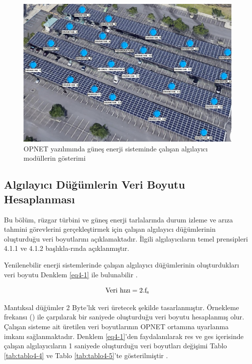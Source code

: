 \begin{figure}[htbp]
\centerline{\includegraphics[width= 14cm]{Resim/mak2solar.png}}
\caption{OPNET yazılımında güneş enerji sisteminde çalışan algılayıcı modüllerin gösterimi}
\label{fig:4-3}
\end{figure}


\subsection{Algılayıcı Düğümlerin Veri Boyutu Hesaplanması}\label{verboyut}

Bu bölüm, rüzgar türbini ve güneş enerji tarlalarında durum izleme ve arıza tahmini görevlerini gerçekleştirmek için çalışan algılayıcı düğümlerinin oluşturduğu veri boyutlarını açıklamaktadır. İlgili algılayıcıların temel prensipleri 4.1.1 ve 4.1.2 başlıkla-rında açıklanmıştır.


Yenilenebilir enerji sistemlerinde çalışan algılayıcı düğümlerinin oluşturdukları veri boyutu Denklem \eqref{eq4-1} ile bulunabilir \cite{ahmed2011simulation}.


\begin{equation}
\text{Veri hızı} = 2.\text{f\textsubscript{s}} \label{eq4-1}
\end{equation}

Mantıksal düğümler 2 Byte’lık veri üretecek şekilde tasarlanmıştır. Örnekleme frekansı () ile çarpılarak bir saniyede oluşturduğu veri boyutu hesaplanmış olur. Çalışan sisteme ait üretilen veri boyutlarının OPNET ortamına uyarlanma imkanı sağlanmaktadır. Denklem \eqref{eq4-1}'den faydalanılarak \gls{res} ve \gls{ges} içerisinde çalışan algılayıcıların 1 saniyede oluşturduğu veri boyutları değişimi Tablo \ref{tab:tablo4-4} ve Tablo \ref{tab:tablo4-5}’te gösterilmiştir \cite{klise2017application}.


